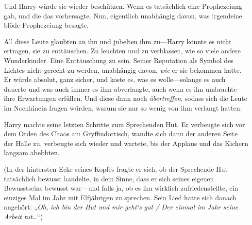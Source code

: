 Und Harry würde sie wieder beschützen. Wenn es tatsächlich eine Prophezeiung gab, und die das vorhersagte. Nun, eigentlich unabhängig davon, was irgendeine blöde Prophezeiung besagte.

All diese Leute glaubten an ihn und jubelten ihm zu—Harry könnte es nicht ertragen, sie zu enttäuschen. Zu leuchten und zu verblassen, wie so viele andere Wunderkinder. Eine Enttäuschung zu sein. Seiner Reputation als Symbol des Lichtes nicht gerecht zu werden, unabhängig davon, \emph{wie} er sie bekommen hatte. Er würde absolut, ganz sicher, und koste es, was es wolle—solange es auch dauerte und was auch immer es ihm abverlangte, auch wenn es ihn umbrachte—ihre Erwartungen erfüllen. Und diese dann noch \emph{übertreffen}, sodass sich die Leute im Nachhinein fragen würden, warum sie nur so wenig von ihm verlangt hatten.


Harry machte seine letzten Schritte zum Sprechenden Hut. Er verbeugte sich vor dem Orden des Chaos am Gryffindortisch, wandte sich dann der anderen Seite der Halle zu, verbeugte sich wieder und wartete, bis der Applaus und das Kichern langsam abebbten.

(In der hintersten Ecke seines Kopfes fragte er sich, ob der Sprechende Hut tatsächlich bewusst handelte, in dem Sinne, dass er sich seines eigenen Bewusstseins bewusst war—und falls ja, ob es ihn wirklich zufriedenstellte, ein einziges Mal im Jahr mit Elfjährigen zu sprechen. Sein Lied hatte sich danach angehört: „\emph{Oh, ich bin der Hut und mir geht‘s gut / Der einmal im Jahr seine Arbeit tut…}“)

